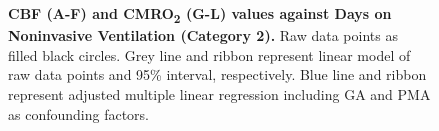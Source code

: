 \documentclass[
  letterpaper,
  DIV=11,
  numbers=noendperiod]{scrartcl}
\begin{document}
\begin{figure}


\caption{\label{fig-cat2}\textbf{CBF (A-F) and CMRO\textsubscript{2}
(G-L) values against Days on Noninvasive Ventilation (Category 2).} Raw
data points as filled black circles. Grey line and ribbon represent
linear model of raw data points and 95\% interval, respectively. Blue
line and ribbon represent adjusted multiple linear regression including
GA and PMA as confounding factors.}

\end{figure}%
\end{document}
